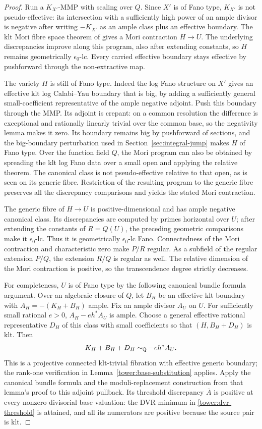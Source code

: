 \begin{proof}
Run a $K_{X'}$-MMP with scaling over $Q$.
Since $X'$ is of Fano type, $K_{X'}$ is not pseudo-effective:
its intersection with a sufficiently high power of an ample
divisor is negative after writing $-K_{X'}$ as an ample class
plus an effective boundary.  The klt Mori fibre space theorem
of \cite{BCHM} gives a Mori contraction $H\to U$.
The underlying discrepancies improve along this program, also
after extending constants, so $H$ remains geometrically
$\epsilon_0$-lc.  Every carried effective boundary stays effective
by pushforward through the non-extractive map.

The variety $H$ is still of Fano type.  Indeed the log Fano
structure on $X'$ gives an effective klt log Calabi--Yau boundary
that is big, by adding a sufficiently general small-coefficient
representative of the ample negative adjoint.  Push this boundary
through the MMP.  Its adjoint is crepant: on a common resolution
the difference is exceptional and rationally linearly trivial
over the common base, so the negativity lemma makes it zero.
Its boundary remains big by pushforward of sections, and the
big-boundary perturbation used in
Section~\ref{sec:integral-jump} makes $H$ of Fano type.
Over the function field $Q$, the Mori program can also be obtained
by spreading the klt log Fano data over a small open and applying
the relative theorem.  The canonical class is not pseudo-effective
relative to that open, as is seen on its generic fibre.  Restriction
of the resulting program to the generic fibre preserves all the
discrepancy comparisons and yields the stated Mori contraction.

The generic fibre of $H\to U$ is positive-dimensional and has
ample negative canonical class.  Its discrepancies are computed
by primes horizontal over $U$; after extending the constants of
$R=Q(U)$, the preceding geometric comparisons make it
$\epsilon_0$-lc.  Thus it is geometrically $\epsilon_0$-lc Fano.
Connectedness of the Mori contraction and characteristic zero
make $P/R$ regular.  As a subfield of the regular extension
$P/Q$, the extension $R/Q$ is regular as well.
The relative dimension of the Mori contraction is positive, so
the transcendence degree strictly decreases.

For completeness, $U$ is of Fano type by the following canonical
bundle formula argument.  Over an algebraic closure of $Q$, let
$B_H$ be an effective klt boundary with
$A_H=-(K_H+B_H)$ ample.  Fix an ample divisor $A_U$ on $U$.
For sufficiently small rational $e>0$, $A_H-e h^*A_U$ is ample.
Choose a general effective rational representative $D_H$ of this
class with small coefficients so that $(H,B_H+D_H)$ is klt.
Then
\[
 K_H+B_H+D_H\sim_{\mathbb Q}-e h^*A_U.
\]
This is a projective connected klt-trivial fibration with
effective generic boundary; the rank-one verification in
Lemma~\ref{tower:base-substitution} applies.
Apply the canonical bundle formula and the moduli-replacement
construction from that lemma's proof to this adjoint pullback.
Its threshold discrepancy $\bar A$ is positive at every nonzero
divisorial base valuation: the DVR minimum in
\eqref{tower:dvr-threshold} is attained, and all its numerators
are positive because the source pair is klt.


\end{proof}
